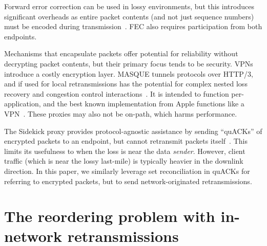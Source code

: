 Forward error correction can be used in lossy environments, but this
introduces significant overheads as entire packet contents (and not just
sequence numbers) must be encoded during transmission~\cite
{rfc9265}. FEC also requires participation from both endpoints.

Mechanisms that encapsulate packets offer potential for reliability without
decrypting packet contents, but their primary focus tends to be security. VPNs
introduce a costly encryption layer. MASQUE tunnels protocols over HTTP/3, and
if used for local retransmissions has the potential for complex nested loss
recovery and congestion control interactions~\cite
{rfc9298,schinazi-masque-proxy-05,kramer2021masquepep}. It is intended to
function per-application, and the best known implementation from Apple
functions like a VPN~\cite{icloud-private-relay}. These proxies may also not be
on-path, which harms performance.

The Sidekick proxy provides protocol-agnostic assistance by sending
``quACKs'' of encrypted packets to an endpoint, but cannot retransmit
packets itself~\cite{yuan2024sidekick}. This limits its usefulness
to when the loss is near the data \textit{sender}.
However, client traffic (which is near the lossy last-mile) is typically heavier
in the downlink direction. In this paper, we similarly leverage set
reconciliation in quACKs for referring to encrypted packets,
but to send network-originated retransmissions.

\section{The reordering problem with in-network retransmissions}
\label{sec:packrat:problem}

